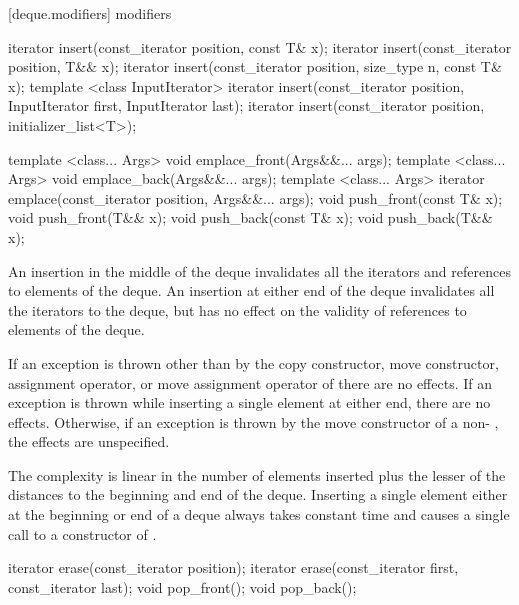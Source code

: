 [deque.modifiers]{ modifiers}

%
%
%
%
\begin{itemdecl}
iterator insert(const_iterator position, const T& x);
iterator insert(const_iterator position, T&& x);
iterator insert(const_iterator position, size_type n, const T& x);
template <class InputIterator>
  iterator insert(const_iterator position,
                  InputIterator first, InputIterator last);
iterator insert(const_iterator position, initializer_list<T>);

template <class... Args> void emplace_front(Args&&... args);
template <class... Args> void emplace_back(Args&&... args);
template <class... Args> iterator emplace(const_iterator position, Args&&... args);
void push_front(const T& x);
void push_front(T&& x);
void push_back(const T& x);
void push_back(T&& x);
\end{itemdecl}

\begin{itemdescr}
\pnum
\effects
An insertion in the middle of the deque invalidates all the iterators and
references to elements of the deque.
An insertion at either end of the
deque invalidates all the iterators to the deque, but has no effect on
the validity of references to elements of the deque.

\pnum
\notes
If an exception is thrown other than by the
copy constructor, move constructor,
assignment operator, or move assignment operator of
there are no effects.
If an exception is thrown while inserting a single element at either end,
there are no effects.
Otherwise, if an exception is thrown by the move constructor of a
non-
, the effects are unspecified.

\pnum
\complexity
The complexity is linear in the number of elements inserted plus the lesser
of the distances to the beginning and end of the deque.
Inserting a single element either at the beginning or end of a deque always takes constant time
and causes a single call to a constructor of
.
\end{itemdescr}

%
\begin{itemdecl}
iterator erase(const_iterator position);
iterator erase(const_iterator first, const_iterator last);
void pop_front();
void pop_back();
\end{itemdecl}

